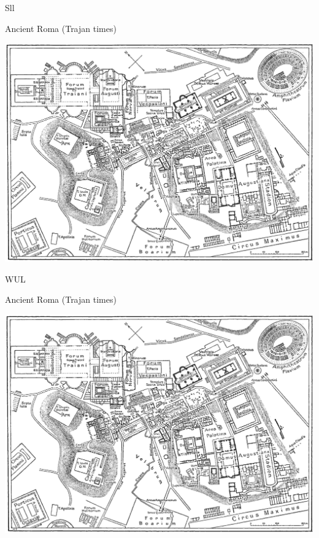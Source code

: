 \documentclass[print,Draft]{faosyb}
\begin{document}
\begin{map}{S}{ll}
\caption{Ancient Roma \newline (Trajan times)}
\label{map:roma}
\includegraphics[width=\chartwidth,height=\chartheight]{Rome}
\end{map}


\begin{map}{W}{UL}
\caption{Ancient Roma \newline (Trajan times)}
\label{map:roma}
\includegraphics[width=\chartwidth,height=\chartheight]{Rome}
\end{map}
\end{document}
